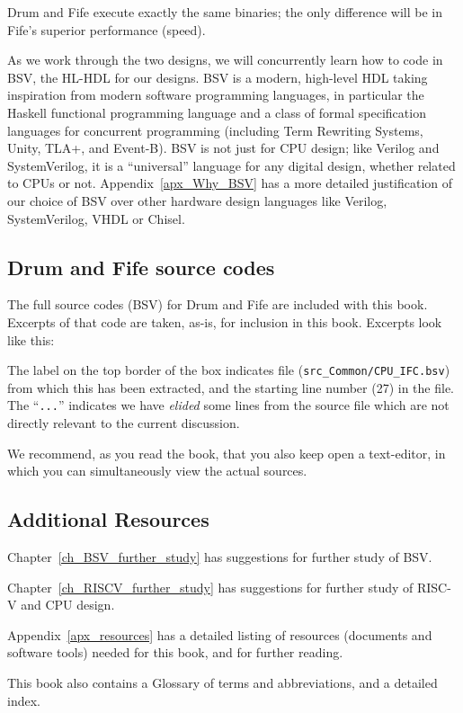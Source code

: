 Drum and Fife execute exactly the same binaries; the only difference
will be in Fife's superior performance (speed).

As we work through the two designs, we will concurrently learn how to
code in BSV, the HL-HDL for our designs.  BSV is a modern, high-level
HDL taking inspiration from modern software programming languages, in
particular the Haskell functional programming language and a class of
formal specification languages for concurrent programming (including
Term Rewriting Systems, Unity, TLA+, and Event-B).  BSV is not just
for CPU design; like Verilog and SystemVerilog, it is a ``universal''
language for any digital design, whether related to CPUs or not.
Appendix~\ref{apx_Why_BSV} has a more detailed justification of our
choice of BSV over other hardware design languages like Verilog,
SystemVerilog, VHDL or Chisel.


\subsection{Drum and Fife source codes}

The full source codes (BSV) for Drum and Fife are included with this
book.  Excerpts of that code are taken, as-is, for inclusion in this
book.  Excerpts look like this:



The label on the top border of the box indicates file
(\verb|src_Common/CPU_IFC.bsv|) from which this has been extracted,
and the starting line number (27) in the file.  The ``\verb|...|''
indicates we have \emph{elided} some lines from the source file which
are not directly relevant to the current discussion.

We recommend, as you read the book, that you also keep open a
text-editor, in which you can simultaneously view the actual sources.


\subsection{Additional Resources}

Chapter~\ref{ch_BSV_further_study} has suggestions for further study
of BSV.

Chapter~\ref{ch_RISCV_further_study} has suggestions for further study
of RISC-V and CPU design.

Appendix~\ref{apx_resources} has a detailed listing of resources
(documents and software tools) needed for this book, and for further
reading.

This book also contains a Glossary of terms and abbreviations, and a
detailed index.

